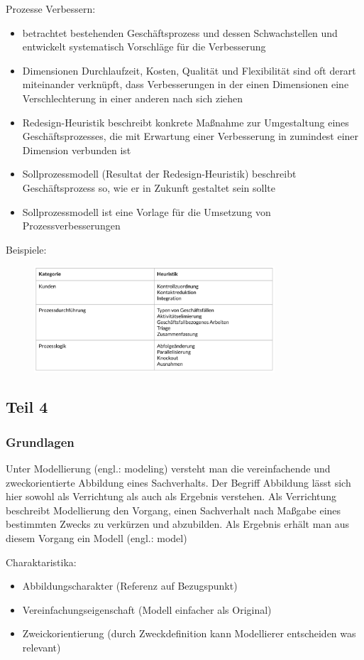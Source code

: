 \clearpage
Prozesse Verbessern:
\begin{itemize}
  \item betrachtet bestehenden Geschäftsprozess und dessen Schwachstellen und entwickelt systematisch Vorschläge für die Verbesserung
  \item Dimensionen Durchlaufzeit, Kosten, Qualität und Flexibilität sind oft derart miteinander verknüpft, dass Verbesserungen in der einen Dimensionen eine Verschlechterung in einer anderen nach sich ziehen
  \item Redesign-Heuristik beschreibt konkrete Maßnahme zur Umgestaltung eines Geschäftsprozesses, die mit Erwartung einer Verbesserung in zumindest einer Dimension verbunden ist
  \item Sollprozessmodell (Resultat der Redesign-Heuristik) beschreibt Geschäftsprozess so, wie er in Zukunft gestaltet sein sollte
  \item Sollprozessmodell ist eine Vorlage für die Umsetzung von Prozessverbesserungen 
\end{itemize}
Beispiele: 
\par
\begin{figure}[htp]
\begin{center}
\includegraphics[width=0.8\textwidth]{assets/BeispieleHeuristiken.PNG}
\end{center}
\end{figure}

\subsection{Teil 4}
\subsubsection{Grundlagen}

Unter Modellierung (engl.: modeling) versteht man die vereinfachende und zweckorientierte Abbildung eines Sachverhalts. Der Begriff Abbildung lässt sich hier sowohl als Verrichtung als auch als Ergebnis verstehen. Als Verrichtung beschreibt Modellierung den Vorgang, einen Sachverhalt nach Maßgabe eines bestimmten Zwecks zu verkürzen und abzubilden. Als Ergebnis erhält man aus diesem Vorgang ein Modell (engl.: model)
\par
Charaktaristika:
\begin{itemize}
 \item Abbildungscharakter (Referenz auf Bezugspunkt)
 \item Vereinfachungseigenschaft (Modell einfacher als Original) 
 \item Zweickorientierung (durch Zweckdefinition kann Modellierer entscheiden was relevant)
\end{itemize}

